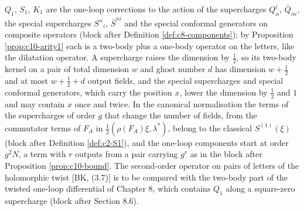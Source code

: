 \begin{remark}
$Q_1$, $S_1$, $K_1$ are the one-loop corrections to the action of the supercharges $Q^i_\alpha$, $\bar Q_{\dot\alpha i}$, the special supercharges $S^\alpha{}_i$, $\bar S^{\dot\alpha i}$ and the special conformal generators on composite operators (block after Definition \ref{def:c8-components}); by Proposition \ref{prop:c10-arity1} each is a two-body plus a one-body operator on the letters, like the dilatation operator. A supercharge raises the dimension by $\tfrac12$, so its two-body kernel on a pair of total dimension $w$ and ghost number $d$ has dimension $w+\tfrac12$ and at most $w+\tfrac12+d$ output fields, and the special supercharges and special conformal generators, which carry the position $x$, lower the dimension by $\tfrac12$ and $1$ and may contain $x$ once and twice. In the canonical normalisation the terms of the supercharges of order $g$ that change the number of fields, from the commutator terms of $F_A$ in $\tfrac12(\rho(F_A)\xi,\lambda^*)$, belong to the classical $S^{(1)}(\xi)$ (block after Definition \ref{def:c2-S1}), and the one-loop components start at order $g^2N$, a term with $r$ outputs from a pair carrying $g^r$ as in the block after Proposition \ref{prop:c10-bound}. The second-order operator on pairs of letters of the holomorphic twist [BK, (3.7)] is to be compared with the two-body part of the twisted one-loop differential of Chapter 8, which contains $Q_1$ along a square-zero supercharge (block after Section 8.6).
\end{remark}
